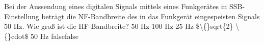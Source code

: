     {Bei der Aussendung eines digitalen Signals mittels eines Funkgerätes in SSB-Einstellung beträgt die NF-Bandbreite des in das Funkgerät eingespeisten Signals 50 Hz. Wie groß ist die HF-Bandbreite?}
    {50 Hz}
    {100 Hz}
    {25 Hz}
    {\$\textbackslash\{\}sqrt\{2\} \textbackslash\{\}cdot\$ 50 Hz}
    {false}{false}